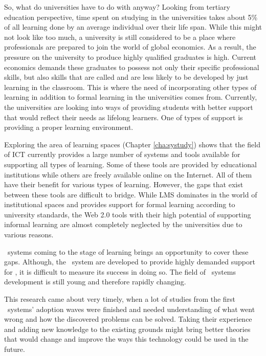 So, what do universities have to do with \LLLs anyway? Looking from tertiary
education perspective, time spent on studying in the universities takes about
5\% of all learning done by an average individual over their life span. While
this might not look like too much, a university is still considered to be a
place where professionals are prepared to join the world of global economics. As
a result, the pressure on the university to produce highly qualified graduates
is high. Current economics demands these graduates to possess not only their
specific professional skills, but also skills that are called \LLLs and are less
likely to be developed by just learning in the classroom. This is where the
need of incorporating other types of learning in addition to formal learning in
the universities comes from. Currently, the universities are looking into ways
of providing students with better support that would reflect their needs as
lifelong learners. One of types of support is providing a proper learning
environment.


Exploring the area of learning spaces (Chapter \ref{cha:systudy}) shows that
the field of ICT currently provides a large number of systems and tools
available for supporting all types of learning. Some of these tools are provided
by educational institutions while others are freely available online on the
Internet. All of them have their benefit for various types of learning. However,
the gaps that exist between these tools are difficult to bridge. While LMS
dominates in the world of institutional spaces and provides support for formal
learning according to university standards, the Web 2.0 tools with their high
potential of supporting informal learning are almost completely neglected by the
universities due to various reasons.

\ep~systems coming to the stage of learning brings an opportunity to cover these
gaps. Although, the \ep~system are developed to provide highly demanded support
for \LLLsn, it is difficult to measure its success in doing so. The field of
\ep~systems development is still young and therefore rapidly changing.

This research came about very timely, when a lot of studies from the first
\ep~systems' adoption waves were finished and needed understanding of what went
wrong and how the discovered problems can be solved. Taking their experience and
adding new knowledge to the existing grounds might bring better theories that
would change and improve the ways this technology could be used in the future.

